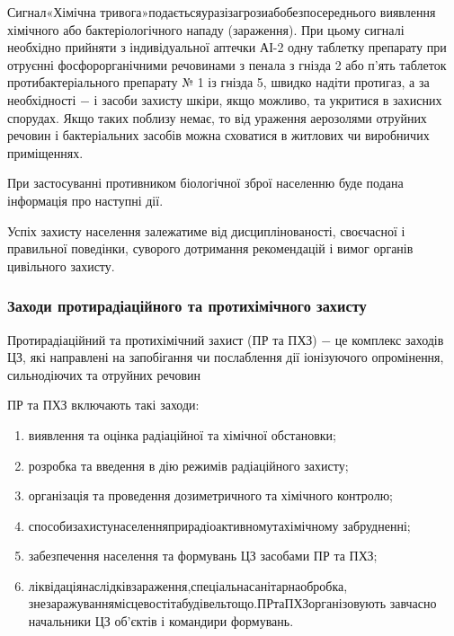 Сигнал\hfill «Хімічна тривога»\hfill подається\hfill у\hfill разі\hfill загрози\hfill або\newline безпосереднього виявлення хімічного або бактеріологічного нападу (зараження). При цьому сигналі необхідно прийняти з індивідуальної аптечки АІ-2 одну таблетку препарату при отруєнні фосфорорганічними речовинами з пенала з гнізда 2 або п'ять таблеток протибактеріального препарату № 1 із гнізда 5, швидко надіти протигаз, а за необхідності $-$ і засоби захисту шкіри, якщо можливо, та укритися в захисних спорудах. Якщо таких поблизу немає, то від ураження аерозолями отруйних речовин і бактеріальних засобів можна сховатися в житлових чи виробничих приміщеннях.

При застосуванні противником біологічної зброї населенню буде подана інформація про наступні дії.

Успіх захисту населення залежатиме від дисциплінованості, своєчасної і правильної поведінки, суворого дотримання рекомендацій і вимог органів цивільного захисту.

\subsubsection{Заходи протирадіаційного та протихімічного захисту}

Протирадіаційний та протихімічний захист (ПР та ПХЗ) $-$ це комплекс заходів ЦЗ, які направлені на запобігання чи послаблення дії іонізуючого опромінення, сильнодіючих та отруйних речовин

ПР та ПХЗ включають такі заходи:

\begin{enumerate}
	\item виявлення та оцінка радіаційної та хімічної обстановки;
	\item розробка та введення в дію режимів радіаційного захисту;
	\item організація та проведення дозиметричного та хімічного контролю;
	\item способи\hfill захисту\hfill населення\hfill при\hfill радіоактивному\hfill та\hfill хімічному\newline \hspace*{-20mm} забрудненні;
	\item забезпечення населення та формувань ЦЗ засобами ПР та ПХЗ;
	\item ліквідація\hfill наслідків\hfill зараження,\hfill спеціальна\hfill санітарна\hfill обробка,\newline \hspace*{-20mm} знезаражування\hfill місцевості\hfill та\hfill будівель\hfill тощо.\hfill ПР\hfill та\hfill ПХЗ\hfill організовують\newline \hspace*{-20mm} завчасно начальники ЦЗ об’єктів і командири формувань.
\end{enumerate}

